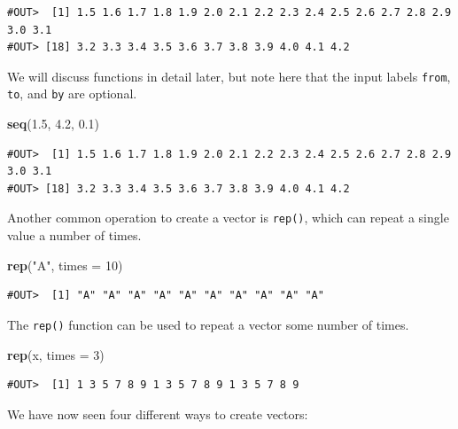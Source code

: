 \documentclass[]{book}
\newenvironment{Shaded}{\begin{snugshade}}{\end{snugshade}}
\newcommand{\DataTypeTok}[1]{\textcolor[rgb]{0.13,0.29,0.53}{#1}}
\newcommand{\DecValTok}[1]{\textcolor[rgb]{0.00,0.00,0.81}{#1}}
\newcommand{\FloatTok}[1]{\textcolor[rgb]{0.00,0.00,0.81}{#1}}
\newcommand{\KeywordTok}[1]{\textcolor[rgb]{0.13,0.29,0.53}{\textbf{#1}}}
\newcommand{\NormalTok}[1]{#1}
\newcommand{\StringTok}[1]{\textcolor[rgb]{0.31,0.60,0.02}{#1}}
\begin{document}
\begin{verbatim}
#OUT>  [1] 1.5 1.6 1.7 1.8 1.9 2.0 2.1 2.2 2.3 2.4 2.5 2.6 2.7 2.8 2.9 3.0 3.1
#OUT> [18] 3.2 3.3 3.4 3.5 3.6 3.7 3.8 3.9 4.0 4.1 4.2
\end{verbatim}

We will discuss functions in detail later, but note here that the input labels \texttt{from}, \texttt{to}, and \texttt{by} are optional.

\begin{Shaded}
\begin{Highlighting}[]
\KeywordTok{seq}\NormalTok{(}\FloatTok{1.5}\NormalTok{, }\FloatTok{4.2}\NormalTok{, }\FloatTok{0.1}\NormalTok{)}
\end{Highlighting}
\end{Shaded}

\begin{verbatim}
#OUT>  [1] 1.5 1.6 1.7 1.8 1.9 2.0 2.1 2.2 2.3 2.4 2.5 2.6 2.7 2.8 2.9 3.0 3.1
#OUT> [18] 3.2 3.3 3.4 3.5 3.6 3.7 3.8 3.9 4.0 4.1 4.2
\end{verbatim}

Another common operation to create a vector is \texttt{rep()}, which can repeat a single value a number of times.

\begin{Shaded}
\begin{Highlighting}[]
\KeywordTok{rep}\NormalTok{(}\StringTok{"A"}\NormalTok{, }\DataTypeTok{times =} \DecValTok{10}\NormalTok{)}
\end{Highlighting}
\end{Shaded}

\begin{verbatim}
#OUT>  [1] "A" "A" "A" "A" "A" "A" "A" "A" "A" "A"
\end{verbatim}

The \texttt{rep()} function can be used to repeat a vector some number of times.

\begin{Shaded}
\begin{Highlighting}[]
\KeywordTok{rep}\NormalTok{(x, }\DataTypeTok{times =} \DecValTok{3}\NormalTok{)}
\end{Highlighting}
\end{Shaded}

\begin{verbatim}
#OUT>  [1] 1 3 5 7 8 9 1 3 5 7 8 9 1 3 5 7 8 9
\end{verbatim}

We have now seen four different ways to create vectors:
\end{document}
